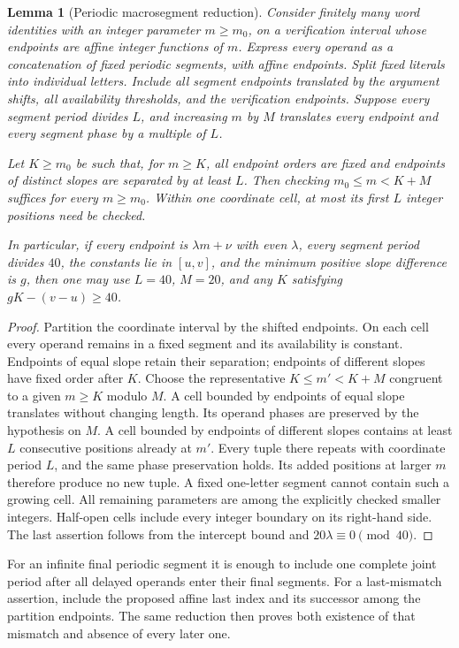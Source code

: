 \documentclass[11pt]{article}
\newtheorem{lemma}[theorem]{Lemma}
\theoremstyle{remark}\newtheorem{remark}[theorem]{Remark}
\begin{document}
\begin{lemma}[Periodic macrosegment reduction]\label{lem:macro40}
Consider finitely many word identities with an integer parameter $m\ge m_0$,
on a verification interval whose endpoints are affine integer functions of
$m$. Express every operand as a concatenation of fixed periodic segments,
with affine endpoints. Split fixed literals into individual letters.
Include all segment endpoints translated by the argument shifts, all
availability thresholds, and the verification endpoints. Suppose every
segment period divides $L$, and increasing $m$ by $M$ translates every
endpoint and every segment phase by a multiple of $L$.

Let $K\ge m_0$ be such that, for $m\ge K$, all endpoint orders are fixed
and endpoints of distinct slopes are separated by at least $L$. Then
checking $m_0\le m<K+M$ suffices for every $m\ge m_0$. Within one coordinate
cell, at most its first $L$ integer positions need be checked.

In particular, if every endpoint is $\lambda m+\nu$ with even $\lambda$,
every segment period divides $40$, the constants lie in $[u,v]$, and the
minimum positive slope difference is $g$, then one may use $L=40$, $M=20$,
and any $K$ satisfying $gK-(v-u)\ge40$.
\end{lemma}
\begin{proof}
Partition the coordinate interval by the shifted endpoints. On each cell
every operand remains in a fixed segment and its availability is constant.
Endpoints of equal slope retain their separation; endpoints of different
slopes have fixed order after $K$. Choose the representative
$K\le m'<K+M$ congruent to a given $m\ge K$ modulo $M$.
A cell bounded by endpoints of equal slope translates without changing
length. Its operand phases are preserved by the hypothesis on $M$.
A cell bounded by endpoints of different slopes contains at least $L$
consecutive positions already at $m'$. Every tuple there repeats with
coordinate period $L$, and the same phase preservation holds. Its added
positions at larger $m$ therefore produce no new tuple. A fixed one-letter
segment cannot contain such a growing cell. All remaining parameters
are among the explicitly checked smaller integers. Half-open cells include
every integer boundary on its right-hand side. The last assertion follows
from the intercept bound and $20\lambda\equiv0\pmod {40}$.
\end{proof}

For an infinite final periodic segment it is enough to include one complete
joint period after all delayed operands enter their final segments. For a
last-mismatch assertion, include the proposed affine last index and its
successor among the partition endpoints. The same reduction then proves
both existence of that mismatch and absence of every later one.
\end{document}
